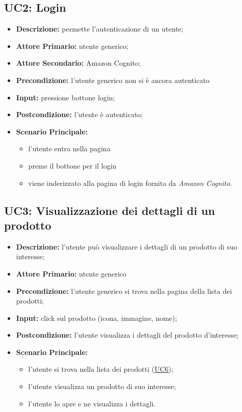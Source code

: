         \subsection{UC2: Login}
        \label{sec:UC2}
        \begin{itemize}
            \item \textbf{Descrizione:} permette l'autenticazione di un utente;
            \item \textbf{Attore Primario:} utente generico;
            \item \textbf{Attore Secondario:} Amazon Cognito;
            \item \textbf{Precondizione:} l'utente generico non si è ancora autenticato
            \item \textbf{Input:} pressione bottone login;
            \item \textbf{Postcondizione:} l'utente è autenticato;
            \item \textbf{Scenario Principale:} 
            \begin{itemize}
                \item l'utente entra nella pagina
                \item preme il bottone per il login
                \item viene inderizzato alla pagina di login fornita da \textit{Amazon Cognito}.
            \end{itemize}
        \end{itemize}
        \subsection{UC3: Visualizzazione dei dettagli di un prodotto}
        \label{sec:UC3}
        \begin{itemize}
            \item \textbf{Descrizione:} l'utente può visualizzare i dettagli di un prodotto di suo interesse;
            \item \textbf{Attore Primario:} utente generico
            \item \textbf{Precondizione:} l'utente generico si trova nella pagina della lista dei prodotti;
            \item \textbf{Input:} click sul prodotto (icona, immagine, nome);
            \item \textbf{Postcondizione:} l'utente visualizza i dettagli del prodotto d'interesse;
            \item \textbf{Scenario Principale:} 
                \begin{itemize}
                    \item l'utente si trova nella lista dei prodotti (\hyperref[sec:UC6]{\underline{UC6}});
                    \item l'utente visualizza un prodotto di suo interesse;
                    \item l'utente lo apre e ne visualizza i dettagli.
                \end{itemize}
        \end{itemize}
